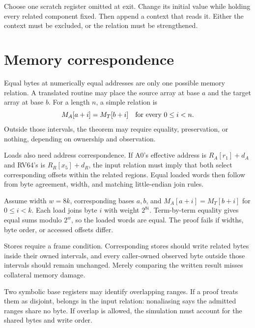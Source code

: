 \begin{tryit}[title={Make freedom executable}]
Choose one scratch register omitted at exit. Change its initial value while
holding every related component fixed. Then append a context that reads it.
Either the context must be excluded, or the relation must be strengthened.
\end{tryit}

\section{Memory correspondence}

Equal bytes at numerically equal addresses are only one possible memory
relation. A translated routine may place the source array at base \(a\) and
the target array at base \(b\). For a length \(n\), a simple relation is
\[
  M_A[a+i]=M_T[b+i]
  \quad\hbox{for every }0\leq i<n.
\]
Outside those intervals, the theorem may require equality, preservation, or
nothing, depending on ownership and observation.

Loads also need address correspondence. If A0's effective address is
\(R_A[r_1]+d_A\) and RV64's is \(R_R[x_5]+d_R\), the input relation must imply
that both select corresponding offsets within the related regions. Equal loaded
words then follow from byte agreement, width, and matching little-endian join
rules.

\begin{proofkit}[title={Related bytes give related little-endian words}]
Assume width \(w=8k\), corresponding bases \(a,b\), and
\(M_A[a+i]=M_T[b+i]\) for \(0\leq i<k\). Each load joins byte \(i\) with
weight \(2^{8i}\). Term-by-term equality gives equal sums modulo \(2^w\), so
the loaded words are equal. The proof fails if widths, byte order, or accessed
offsets differ.
\end{proofkit}

Stores require a frame condition. Corresponding stores should write related
bytes inside their owned intervals, and every caller-owned observed byte
outside those intervals should remain unchanged. Merely comparing the written
result misses collateral memory damage.

\begin{warning}[title={A memory relation must survive aliasing}]
Two symbolic base registers may identify overlapping ranges. If a proof treats
them as disjoint,  belongs in the input relation:
nonaliasing says the admitted ranges share no byte. If overlap is
allowed, the simulation must account for the shared bytes and write order.
\end{warning}

